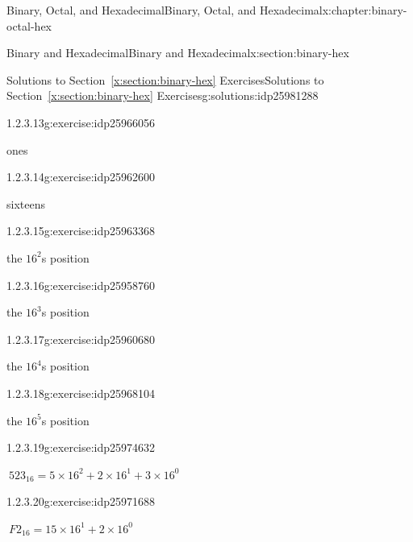 \documentclass[twoside,10pt,]{book}
\newcommand{\xreffont}{\relax}
\numberwithin{equation}{section}
\begin{document}
\begin{chapterptx}{Binary, Octal, and Hexadecimal}{}{Binary, Octal, and Hexadecimal}{}{}{x:chapter:binary-octal-hex}
\begin{sectionptx}{Binary and Hexadecimal}{}{Binary and Hexadecimal}{}{}{x:section:binary-hex}
\begin{solutions-subsection}{Solutions to Section~{\xreffont\ref*{x:section:binary-hex}} Exercises}{}{Solutions to Section~{\xreffont\ref*{x:section:binary-hex}} Exercises}{}{}{g:solutions:idp25981288}
\par\medskip\noindent
\begin{exercisegroup}
\begin{divisionsolutioneg}{1.2.3.13}{}{g:exercise:idp25966056}%
\par\smallskip%
\noindent\hypertarget{g:solution:idp25964136-main}{}ones\end{divisionsolutioneg}%
\begin{divisionsolutioneg}{1.2.3.14}{}{g:exercise:idp25962600}%
\par\smallskip%
\noindent\hypertarget{g:solution:idp25962856-main}{}sixteens\end{divisionsolutioneg}%
\begin{divisionsolutioneg}{1.2.3.15}{}{g:exercise:idp25963368}%
\par\smallskip%
\noindent\hypertarget{g:solution:idp25962472-main}{}the \(16^2\)s position\end{divisionsolutioneg}%
\begin{divisionsolutioneg}{1.2.3.16}{}{g:exercise:idp25958760}%
\par\smallskip%
\noindent\hypertarget{g:solution:idp25959272-main}{}the \(16^3\)s position\end{divisionsolutioneg}%
\begin{divisionsolutioneg}{1.2.3.17}{}{g:exercise:idp25960680}%
\par\smallskip%
\noindent\hypertarget{g:solution:idp25968872-main}{}the \(16^4\)s position\end{divisionsolutioneg}%
\begin{divisionsolutioneg}{1.2.3.18}{}{g:exercise:idp25968104}%
\par\smallskip%
\noindent\hypertarget{g:solution:idp25970408-main}{}the \(16^5\)s position\end{divisionsolutioneg}%
\end{exercisegroup}
\par\medskip\noindent
\begin{exercisegroup}
\begin{divisionsolutioneg}{1.2.3.19}{}{g:exercise:idp25974632}%
\par\smallskip%
\noindent\hypertarget{g:solution:idp25966952-main}{}\(\ 523_{16}=5\times16^2+2\times16^1+3\times16^0\)\end{divisionsolutioneg}%
\begin{divisionsolutioneg}{1.2.3.20}{}{g:exercise:idp25971688}%
\par\smallskip%
\noindent\hypertarget{g:solution:idp25971304-main}{}\(\ F2_{16}=15\times16^1+2\times16^0\)\end{divisionsolutioneg}%

\end{exercisegroup}
\end{solutions-subsection}
\end{sectionptx}
\end{chapterptx}
\end{document}
